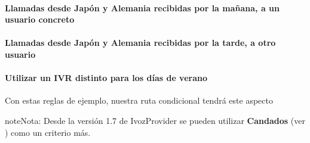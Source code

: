 \documentclass[letterpaper,10pt,spanish]{sphinxmanual}
\begin{document}
\paragraph{Llamadas desde Japón y Alemania recibidas por la mañana, a un usuario concreto}

\noindent{}
\paragraph{Llamadas desde Japón y Alemania recibidas por la tarde, a otro usuario}

\noindent{}
\paragraph{Utilizar un IVR distinto para los días de verano}

\noindent{}

Con estas reglas de ejemplo, nuestra ruta condicional tendrá este aspecto

\noindent{}

\begin{notice}{note}{Nota:}
Desde la versión 1.7 de IvozProvider se pueden utilizar \textbf{Candados} (ver {\hyperref[pbx_features/route_locks:route\string-locks]{}}) como un criterio más.
\end{notice}
\end{document}
